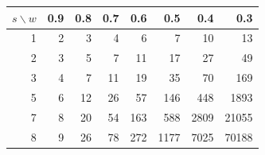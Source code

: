 \begin{tabular}{@{}rrrrrrrr@{}}
\toprule
$s \backslash w$ & 0.9 & 0.8 & 0.7 & 0.6 & 0.5 & 0.4 & 0.3 \\
\midrule
1 & 2 & 3 & 4 & 6 & 7 & 10 & 13 \\
2 & 3 & 5 & 7 & 11 & 17 & 27 & 49 \\
3 & 4 & 7 & 11 & 19 & 35 & 70 & 169 \\
5 & 6 & 12 & 26 & 57 & 146 & 448 & 1893 \\
7 & 8 & 20 & 54 & 163 & 588 & 2809 & 21055 \\
8 & 9 & 26 & 78 & 272 & 1177 & 7025 & 70188 \\
\bottomrule
\end{tabular}
